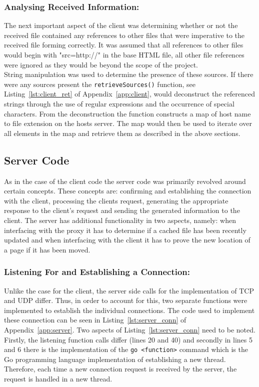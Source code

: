 \documentclass[10pt,twocolumn]{witseiepaper}
\begin{document}
		\subsubsection*{Analysing Received Information:} The next important aspect of the client was determining whether or not the received file contained any references to other files that were imperative to the received file forming correctly. It was assumed that all references to other files would begin with "src=http://" in the base HTML file, all other file references were ignored as they would be beyond the scope of the project.\\
		
		String manipulation was used to determine the presence of these sources. If there were any sources present the \texttt{retrieveSources()} function, see Listing~\ref{lst:client_ret} of Appendix~\ref{app:client}, would deconstruct the referenced strings through the use of regular expressions and the occurrence of special characters. From the deconstruction the function constructs a map of host name to file extension on the hosts server. The map would then be used to iterate over all elements in the map and retrieve them as described in the above sections.
				
	\subsection{Server Code}
	
		As in the case of the client code the server code was primarily revolved around certain concepts. These concepts are: confirming and establishing the connection with the client, processing the clients request, generating the appropriate response to the client's request and sending the generated information to the client. The server has additional functionality in two aspects, namely: when interfacing with the proxy it has to determine if a cached file has been recently updated and when interfacing with the client it has to prove the new location of a page if it has been moved.  
		
		\subsubsection*{Listening For and Establishing a Connection:} Unlike the case for the client, the server side calls for the implementation of TCP and UDP differ. Thus, in order to account for this, two separate functions were implemented to establish the individual connections. The code used to implement these connection can be seen in Listing~\ref{lst:server_conn} of Appendix~\ref{app:server}. Two aspects of Listing~\ref{lst:server_conn} need to be noted. Firstly, the listening function calls differ (lines 20 and 40) and secondly in lines 5 and 6 there is the implementation of the \texttt{go <function>} command which is the Go programming language implementation of establishing a new thread. Therefore, each time a new connection request is received by the server, the request is handled in a new thread. 
		
\end{document}
